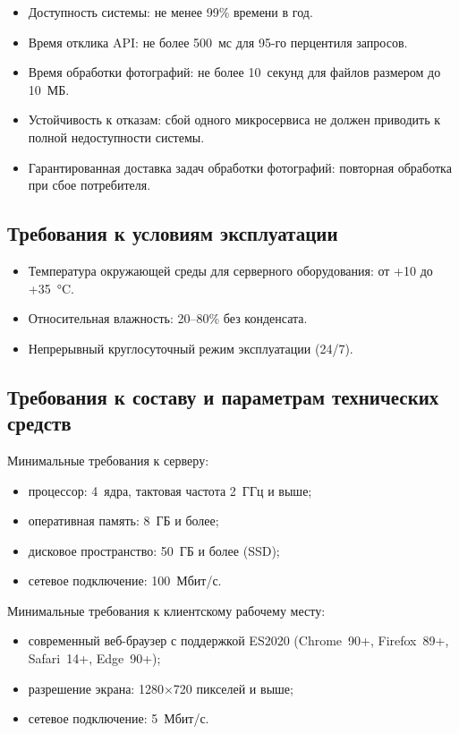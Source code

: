 \begin{itemize}
  \item Доступность системы: не менее 99\% времени в год.
  \item Время отклика API: не более 500~мс для 95-го перцентиля запросов.
  \item Время обработки фотографий: не более 10~секунд для файлов размером до 10~МБ.
  \item Устойчивость к отказам: сбой одного микросервиса не должен приводить к полной недоступности системы.
  \item Гарантированная доставка задач обработки фотографий: повторная обработка при сбое потребителя.
\end{itemize}

\subsection{Требования к условиям эксплуатации}

\begin{itemize}
  \item Температура окружающей среды для серверного оборудования: от +10 до +35~°C.
  \item Относительная влажность: 20--80\% без конденсата.
  \item Непрерывный круглосуточный режим эксплуатации (24/7).
\end{itemize}

\subsection{Требования к составу и параметрам технических средств}

Минимальные требования к серверу:
\begin{itemize}
  \item процессор: 4~ядра, тактовая частота 2~ГГц и выше;
  \item оперативная память: 8~ГБ и более;
  \item дисковое пространство: 50~ГБ и более (SSD);
  \item сетевое подключение: 100~Мбит/с.
\end{itemize}

Минимальные требования к клиентскому рабочему месту:
\begin{itemize}
  \item современный веб-браузер с поддержкой ES2020 (Chrome~90+, Firefox~89+, Safari~14+, Edge~90+);
  \item разрешение экрана: 1280$\times$720 пикселей и выше;
  \item сетевое подключение: 5~Мбит/с.
\end{itemize}

